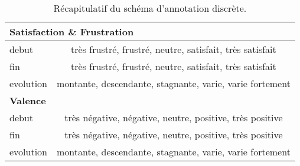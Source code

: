 \begin{table}[h]
    \centering
    \begin{tabular}{|p{3cm}|c|}
        \hline
        \multicolumn{2}{|l|}{\textbf{Satisfaction \& Frustration}} \\
        \hline
          debut       & très frustré, frustré, neutre, satisfait, très satisfait \\
          fin         & très frustré, frustré, neutre, satisfait, très satisfait \\
          evolution   & montante, descendante, stagnante, varie, varie fortement \\
         \hline
         \multicolumn{2}{|l|}{\textbf{Valence}} \\
         \hline
         debut        & très négative, négative, neutre, positive, très positive \\
         fin          & très négative, négative, neutre, positive, très positive \\
         evolution    & montante, descendante, stagnante, varie, varie fortement \\
         \hline
    \end{tabular}
    \caption{Récapitulatif du schéma d'annotation discrète.}
    \label{tab:annotationDiscrete}
\end{table}
